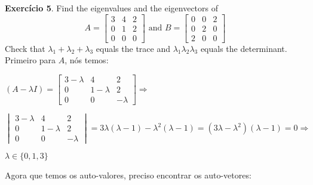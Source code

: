 \documentclass[12pt]{article}
\begin{document}
\noindent\textbf{Exercício 5}. Find the eigenvalues and the eigenvectors of
$$A = \left[\begin{matrix}
    3 & 4 & 2 \\
    0 & 1 & 2 \\
    0 & 0 & 0
  \end{matrix}\right] \text{ and } B = \left[\begin{matrix}
    0 & 0 & 2 \\
    0 & 2 & 0 \\
    2 & 0 & 0
  \end{matrix}\right]$$
Check that $\lambda_1 + \lambda_2 + \lambda_3$ equals the trace and $\lambda_1\lambda_2\lambda_3$ equals the determinant.\\
Primeiro para $A$, nós temos:
\begin{center}
  $(A-\lambda I)=
  \begin{bmatrix}
    3-\lambda & 4 & 2\\
    0 & 1-\lambda & 2\\
    0 & 0 & -\lambda
  \end{bmatrix}\Rightarrow$
\end{center}
\begin{center}
  $\begin{vmatrix}
    3-\lambda & 4 & 2\\
    0 & 1-\lambda & 2\\
    0 & 0 & -\lambda
  \end{vmatrix}=3\lambda(\lambda-1)-\lambda^2(\lambda-1)=
  (3\lambda-\lambda^2)(\lambda-1)=0\Rightarrow
  $
\end{center}
\begin{center}
  $\lambda \in \{0,1,3\}$
\end{center}
Agora que temos os auto-valores, preciso encontrar os auto-vetores:
\end{document}
